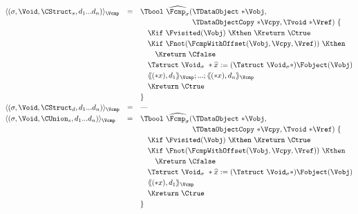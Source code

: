 \begin{docpart}
\begin{figure}[htbp]
  \begin{center}
    \small
    \[\def\arraystretch{1.2}
    \begin{array}{@{}lcl@{}}
      \gegen{(\sigma, \Void, \CStruct_s, d_1... d_n)}_{\Vcmp} &
      =& \Tbool\ \widehat{\Fcmp_{\sigma}}
          (\begin{array}[t]{@{}l@{}}
             \TDataObject\ {*}\Vobj, \\
             \TDataObjectCopy\ {*}\Vcpy, \Tvoid\ {*}\Vref)\ \{ 
           \end{array}\\
      && \quad \Kif\ \Fvisited(\Vobj)\ \Kthen\ \Kreturn\ \Ctrue \\
      && \quad \Kif\ \Fnot(\FcmpWithOffset(\Vobj, \Vcpy, \Vref))\
               \Kthen\\
      && \qquad \Kreturn\ \Cfalse \\
      && \quad \Tstruct\ \Void_{\sigma}\ *\widehat{x} 
               := (\Tstruct\ \Void_{\sigma}*)\Fobject(\Vobj) \\
      && \quad \gegen*{(*x), d_1}_{\Vcmp}; ...; 
               \gegen*{(*x), d_n}_{\Vcmp}\\
      && \quad \Kreturn\ \Ctrue \\
      && \} \\
      \gegen{(\sigma, \Void, \CStruct_d, d_1... d_n)}_{\Vcmp} &
      =& \mbox{---}
      \\
      \gegen{(\sigma, \Void, \CUnion_s, d_1... d_n)}_{\Vcmp} &
      =& \Tbool\ \widehat{\Fcmp_{\sigma}}
          (\begin{array}[t]{@{}l@{}}
             \TDataObject\ {*}\Vobj, \\
             \TDataObjectCopy\ {*}\Vcpy, \Tvoid\ {*}\Vref)\ \{ 
           \end{array}\\
      && \quad \Kif\ \Fvisited(\Vobj)\ \Kthen\ \Kreturn\ \Ctrue \\
      && \quad \Kif\ \Fnot(\FcmpWithOffset(\Vobj, \Vcpy, \Vref))\
               \Kthen\\
      && \qquad \Kreturn\ \Cfalse \\
      && \quad \Tstruct\ \Void_{\sigma}\ *\widehat{x} 
               := (\Tstruct\ \Void_{\sigma}*)\Fobject(\Vobj) \\
      && \quad \gegen*{(*x), d_1}_{\Vcmp}\\
      && \quad \Kreturn\ \Ctrue \\
      && \} \\

\end{array}\]
\end{center}
\end{figure}
\end{docpart}
